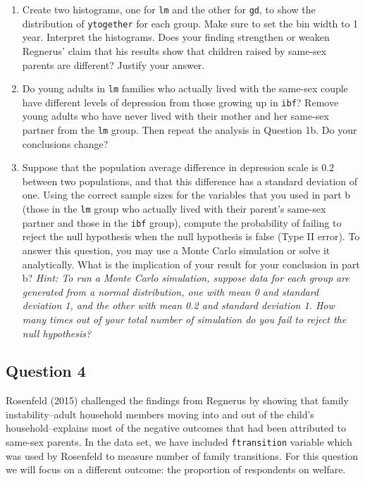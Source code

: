 \documentclass[]{article}
\begin{document}
\begin{enumerate}
\def\labelenumi{\alph{enumi}.}
\item
  Create two histograms, one for \texttt{lm} and the other for
  \texttt{gd}, to show the distribution of \texttt{ytogether} for each
  group. Make sure to set the bin width to 1 year. Interpret the
  histograms. Does your finding strengthen or weaken Regnerus' claim
  that his results show that children raised by same-sex parents are
  different? Justify your answer.
\item
  Do young adults in \texttt{lm} families who actually lived with the
  same-sex couple have different levels of depression from those growing
  up in \texttt{ibf}? Remove young adults who have never lived with
  their mother and her same-sex partner from the \texttt{lm} group. Then
  repeat the analysis in Question 1b. Do your conclusions change?
\item
  Suppose that the population average difference in depression scale is
  0.2 between two populations, and that this difference has a standard
  deviation of one. Using the correct sample sizes for the variables
  that you used in part b (those in the \texttt{lm} group who actually
  lived with their parent's same-sex partner and those in the
  \texttt{ibf} group), compute the probability of failing to reject the
  null hypothesis when the null hypothesis is false (Type II error). To
  answer this question, you may use a Monte Carlo simulation or solve it
  analytically. What is the implication of your result for your
  conclusion in part b? \emph{Hint: To run a Monte Carlo simulation,
  suppose data for each group are generated from a normal distribution,
  one with mean 0 and standard deviation 1, and the other with mean 0.2
  and standard deviation 1. How many times out of your total number of
  simulation do you fail to reject the null hypothesis?}
\end{enumerate}

\subsection{Question 4}\label{question-4}

Rosenfeld (2015) challenged the findings from Regnerus by showing that
family instability--adult household members moving into and out of the
child's household--explains most of the negative outcomes that had been
attributed to same-sex parents. In the data set, we have included
\texttt{ftransition} variable which was used by Rosenfeld to measure
number of family transitions. For this question we will focus on a
different outcome: the proportion of respondents on welfare.
\end{document}
